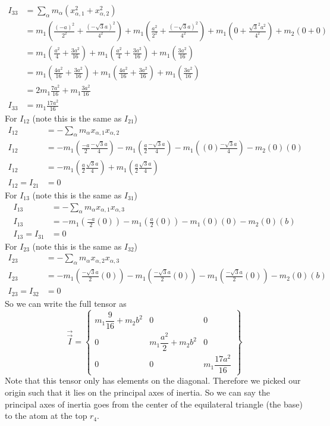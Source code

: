 \documentclass[11pt]{article}
\numberwithin{equation}{section}
\begin{document}
\begin{enumerate}[(a)]
\begin{align*}
I_{33} &= \sum_{\alpha}m_{\alpha}(x^2_{\alpha,1}+x^2_{\alpha,2})\\
&= m_1\left(\frac{(-a)^2}{2^2}+\frac{(-\sqrt{3}a)^2}{4^2}\right)+m_1\left(\frac{a^2}{2^2}+\frac{(-\sqrt{3}a)^2}{4^2}\right)+m_1\left(0+\frac{\sqrt{3}^2a^2}{4^2}\right) +m_2(0+0)\\
&= m_1\left(\frac{a^2}{4}+\frac{3a^2}{16}\right)+m_1\left(\frac{a^2}{4}+\frac{3a^2}{16}\right)+m_1\left(\frac{3a^2}{16}\right) \\
&= m_1\left(\frac{4a^2}{16}+\frac{3a^2}{16}\right)+m_1\left(\frac{4a^2}{16}+\frac{3a^2}{16}\right)+m_1\left(\frac{3a^2}{16}\right) \\
&= 2m_1\frac{7a^2}{16}+m_1\frac{3a^2}{16} \\
I_{33} &= m_1\frac{17a^2}{16} 
\end{align*}
For $I_{12}$ (note this is the same as $I_{21}$)
\begin{align*}
I_{12} &= -\sum_{\alpha}m_{\alpha}x_{\alpha,1}x_{\alpha,2}\\
I_{12} &= -m_1\left(\frac{-a}{2}\frac{-\sqrt{3}a}{4}\right)-m_1\left(\frac{a}{2}\frac{-\sqrt{3}a}{4}\right)-m_1\left((0)\frac{-\sqrt{3}a}{4}\right)-m_2(0)(0)\\
I_{12} &= -m_1\left(\frac{a}{2}\frac{\sqrt{3}a}{4}\right)+m_1\left(\frac{a}{2}\frac{\sqrt{3}a}{4}\right)\\
I_{12} = I_{21} &=0 
\end{align*}
For $I_{13}$ (note this is the same as $I_{31}$)
\begin{align*}
I_{13} &= -\sum_{\alpha}m_{\alpha}x_{\alpha,1}x_{\alpha,3}\\
I_{13} &= -m_1\left(\frac{-a}{2}(0)\right)-m_1\left(\frac{a}{2}(0)\right)-m_1(0)(0)-m_2(0)(b)\\
I_{13} = I_{31} &=0 
\end{align*}
For $I_{23}$ (note this is the same as $I_{32}$)
\begin{align*}
I_{23} &= -\sum_{\alpha}m_{\alpha}x_{\alpha,2}x_{\alpha,3}\\
I_{23} &= -m_1\left(\frac{-\sqrt{3}a}{2}(0)\right)-m_1\left(\frac{-\sqrt{3}a}{2}(0)\right)-m_1\left(\frac{-\sqrt{3}a}{2}(0)\right)-m_2(0)(b)\\
I_{23} = I_{32} &=0 
\end{align*}
So we can write the full tensor as
$$\vec{\vec{I}} = \left\{\begin{array}{ccc}
		m_1\dfrac{9}{16}+m_2b^2	&0				&0\\
 		0			&m_1\dfrac{a^2}{2}+m_2b^2	&0\\
 		0			&0		&m_1\dfrac{17a^2}{16} 
		\end{array}\right\}$$
Note that this tensor only has elements on the diagonal. Therefore we picked our origin such that it lies on the principal axes of inertia. So we can say the principal axes of inertia goes from the center of the equilateral triangle (the base) to the atom at the top $r_4$.
	

\end{enumerate}
\end{document}
